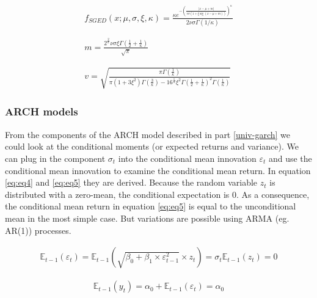 \documentclass[a4paper, nobind]{templates/ociamthesis}
\begin{document}
\begin{equation}
\begin{array}{c}f_{S G E D}(x ; \mu, \sigma, \xi, \kappa)=\frac{\kappa e^{-\left(\frac{|x-\mu+m|}{v \sigma(1+\xi \operatorname{sig}(x-\mu+m))}\right)^{\kappa}}}{2 \nu \sigma \Gamma(1 / \kappa)} \\ \\ \\ m=\frac{2^{\frac{2}{\kappa}} \nu \sigma \xi \Gamma\left(\frac{1}{2}+\frac{1}{\kappa}\right)}{\sqrt{\pi}} \\ \\ \\ v=\sqrt{\frac{\pi \Gamma\left(\frac{1}{\kappa}\right)}{\pi\left(1+3 \xi^{2}\right) \Gamma\left(\frac{3}{\kappa}\right)-16^{\frac{1}{\kappa}} \xi^{2} \Gamma\left(\frac{1}{2}+\frac{1}{\kappa}\right)^{2} \Gamma\left(\frac{1}{\kappa}\right)}}\end{array}\label{eq:sged}
\end{equation}

\hypertarget{ARCH}{%
\subsubsection{ARCH models}\label{ARCH}}

\noindent From the components of the ARCH model described in part \ref{univ-garch} we could look at the conditional moments (or expected returns and variance). We can plug in the component \(\sigma_t\) into the conditional mean innovation \(\varepsilon_{t}\) and use the conditional mean innovation to examine the conditional mean return. In equation \eqref{eq:eq4} and \eqref{eq:eq5} they are derived. Because the random variable \(z_t\) is distributed with a zero-mean, the conditional expectation is 0. As a consequence, the conditional mean return in equation \eqref{eq:eq5} is equal to the unconditional mean in the most simple case. But variations are possible using ARMA (eg. AR(1)) processes.

\begin{align} 
\mathbb{E}_{t-1}(\varepsilon_{t}) = \mathbb{E}_{t-1}(\sqrt{\beta_0 + \beta_1 \times  \varepsilon_{t-1}^2} \times z_t) = \sigma_t\mathbb{E}_{t-1}(z_t) = 0
 \label{eq:eq4}
\end{align} 

\begin{align} 
\mathbb{E}_{t-1}(y_{t}) = \alpha_0 + \mathbb{E}_{t-1}(\varepsilon_{t}) = \alpha_0
 \label{eq:eq5}
\end{align}
\end{document}
